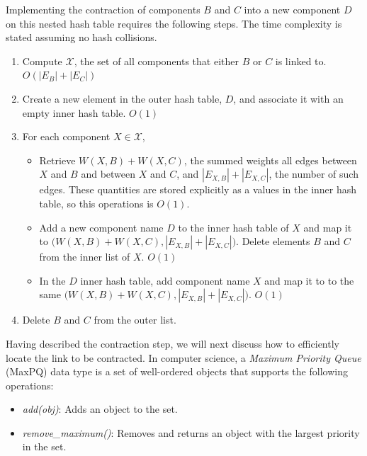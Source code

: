 Implementing the contraction of components $B$ and $C$ into a new
component $D$ on this nested hash table requires the following steps.
The time complexity is stated assuming no hash collisions.

\begin{enumerate}
\item
Compute $\mathcal{X}$, the set of all components that either $B$ or $C$
is linked to. $O(|E_B| + |E_C|)$

\item
Create a new element in the outer hash table, $D$, and associate it
with an empty inner hash table. $O(1)$

\item
For each component $X \in \mathcal{X}$,
\begin{itemize}
\item
Retrieve $W(X,B) + W(X,C)$, the summed weights all edges between $X$
and $B$ and between $X$ and $C$, and $|E_{X,B}| + |E_{X,C}|$, the
number of such edges. These quantities are stored explicitly as a
values in the inner hash table, so this operations is $O(1)$.

\item
Add a new component name $D$ to the inner hash table of $X$ and map it
to $\big( W(X,B) + W(X,C), |E_{X,B}| + |E_{X,C}| \big)$. Delete
elements $B$ and $C$ from the inner list of $X$. $O(1)$

\item
In the $D$ inner hash table, add component name $X$ and map it to
to the same $\big( W(X,B) + W(X,C), |E_{X,B}| + |E_{X,C}| \big)$.
$O(1)$
\end{itemize}

\item
Delete $B$ and $C$ from the outer list.
\end{enumerate}

Having described the contraction step, we will next discuss how to
efficiently locate the link to be contracted.
In computer science, a \textit{Maximum Priority Queue} (MaxPQ) data
type is a set of well-ordered objects that supports the following
operations:

\begin{itemize}
\item
\textit{add(obj)}: Adds an object to the set.

\item
\textit{remove\_maximum()}: Removes and returns an object with the
largest priority in the set.
\end{itemize}


